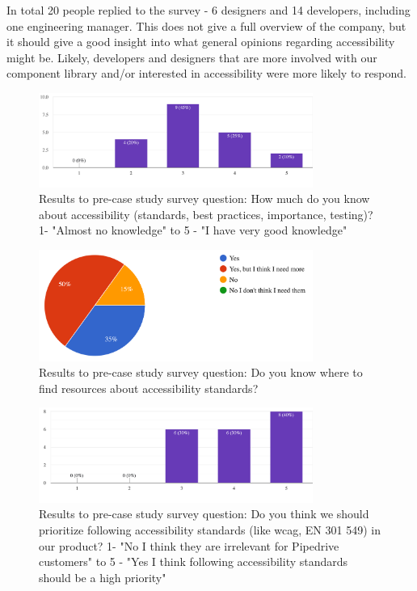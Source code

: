 \documentclass{master_thesis}
\begin{document}
In total 20 people replied to the survey - 6 designers and 14 developers, including one engineering manager. This does not give a full overview of the company, but it should give a good insight into what general opinions regarding accessibility might be. Likely, developers and designers that are more involved with our component library and/or interested in accessibility were more likely to respond.

\begin{figure}[H]
    \centering
    \includegraphics[width=0.8\textwidth]{img/a11y-knowledge.png}
    \caption{Results to pre-case study survey question: How much do you know about accessibility (standards, best practices, importance, testing)? 1- "Almost no knowledge" to 5 - "I have very good knowledge" }
    \label{fig:a11y-knowledge}
\end{figure}

\begin{figure}[H]
    \centering
    \includegraphics[width=0.8\textwidth]{img/a11y-resources.png}
    \caption{Results to pre-case study survey question: Do you know where to find resources about accessibility standards? }
    \label{fig:a11y-resources}
\end{figure}

\begin{figure}[H]
    \centering
    \includegraphics[width=0.8\textwidth]{img/a11y-priority.png}
    \caption{Results to pre-case study survey question: Do you think we should prioritize following accessibility standards (like \ac{wcag}, EN 301 549) in our product? 1- "No I think they are irrelevant for Pipedrive customers" to 5 - "Yes I think following accessibility standards should be a high priority" }
    \label{fig:a11y-priority}
\end{figure}
\end{document}
